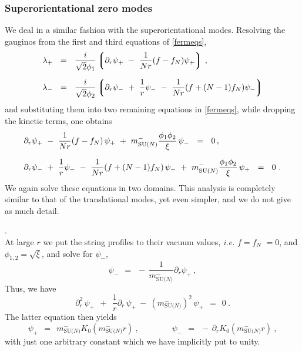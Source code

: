 \documentclass[12pt]{article}
\def\beq{\begin{equation}}
\def\eeq{\end{equation}}
\newcommand{\p}{\partial}
\newcommand{\lgr}{\left\lgroup}
\newcommand{\rgr}{\right\rgroup}
\newcommand{\mNm}{m_\text{SU($N$)}^{-}}
\begin{document}
\subsubsection{Superorientational zero modes}
	We deal in a similar fashion with the superorientational modes.
	Resolving the gauginos from the first and  third equations of \eqref{fermeqs},
\begin{align}
%
\notag
	\lambda_+ & ~~=~~ \frac{i}{\sqrt{2}\phi_1} \lgr \p_r \psi_+ ~-~ \frac{1}{Nr}(f - f_N)\psi_+ \rgr  \,,\\[2mm]
%
\notag
	\lambda_- & ~~=~~ \frac{i}{\sqrt{2}\phi_2} \lgr \p_r \psi_- ~+~ \frac{1}{r} \psi_- ~-~ \frac{1}{Nr}(f + (N-1)f_N)\psi_- \rgr
\end{align}
	and substituting them into   two remaining equations in \eqref{fermeqs}, while dropping 
	the kinetic terms, one obtains
\begin{align}
%
\notag
	& \p_r \psi_+ ~-~ \frac{1}{Nr} (f - f_N)\, \psi_+ ~+~ \mNm \frac{\phi_1\phi_2}{\xi}\, \psi_- ~~=~~ 0 \,,\\[2mm]
%
\label{orient_large_mu}
	& \p_r \psi_- ~+~ \frac{1}{r}\psi_- ~-~ \frac{1}{Nr}(f + (N-1)f_N)\, \psi_- ~+~ \mNm \frac{\phi_1\phi_2}{\xi}\, \psi_+ ~~=~~ 0~.
\end{align}
	We again solve these equations in two domains.
	This analysis is completely similar to that of the translational modes, yet even simpler,
	and we do not give as much detail.

	{.}\\[2mm]
	At large $ r $ we put the string profiles to their vacuum values, {\it i.e.} $ f = f_N $ $ = 0 $,
	and $ \phi_{1,2} = \sqrt{\xi} $, and solve for $ \psi_- $,
\[
	\psi_- ~~=~~ -\,\frac{1}{\mNm} \p_r \psi_+~,
\]
	Thus, we  have
\[	
	\p_r^2\, \psi_+  ~~+~~ \frac{1}{r}\p_r\, \psi_+ ~-~ (\mNm)^2\, \psi_+ ~~=~~ 0~.
\]
	The latter equation then yields 
\beq
\label{sorient_K}
	\psi_+ ~~=~~ \mNm K_0(\mNm r)~, \qquad\qquad \psi_- ~~=~~ -\, \p_r K_0(\mNm r)~,
\eeq
	with just one arbitrary constant which we have implicitly put to unity.
\end{document}
